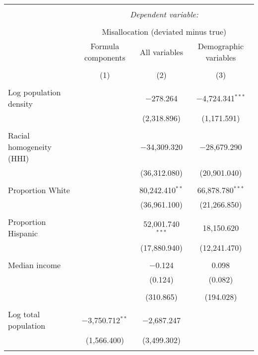 
\begin{table}[!htbp] \centering 
  \caption{} 
  \label{} 
\begin{tabular}{@{\extracolsep{5pt}}lccc} 
\\[-1.8ex]\hline 
\hline \\[-1.8ex] 
 & \multicolumn{3}{c}{\textit{Dependent variable:}} \\ 
\cline{2-4} 
\\[-1.8ex] & \multicolumn{3}{c}{Misallocation (deviated minus true)} \\ 
 & Formula components & All variables & Demographic variables \\ 
\\[-1.8ex] & (1) & (2) & (3)\\ 
\hline \\[-1.8ex] 
 Log population density &  & $-$278.264 & $-$4,724.341$^{***}$ \\ 
  &  & (2,318.896) & (1,171.591) \\ 
  & & & \\ 
 Racial homogeneity (HHI) &  & $-$34,309.320 & $-$28,679.290 \\ 
  &  & (36,312.080) & (20,901.040) \\ 
  & & & \\ 
 Proportion White &  & 80,242.410$^{**}$ & 66,878.780$^{***}$ \\ 
  &  & (36,961.100) & (21,266.850) \\ 
  & & & \\ 
 Proportion Hispanic &  & 52,001.740$^{***}$ & 18,150.620 \\ 
  &  & (17,880.940) & (12,241.470) \\ 
  & & & \\ 
 Median income &  & $-$0.124 & 0.098 \\ 
  &  & (0.124) & (0.082) \\ 
  & & & \\ 
  &  & (310.865) & (194.028) \\ 
  & & & \\ 
 Log total population & $-$3,750.712$^{**}$ & $-$2,687.247 &  \\ 
  & (1,566.400) & (3,499.302) &  \\ 
  & & & \\ 

\end{tabular}
\end{table}
